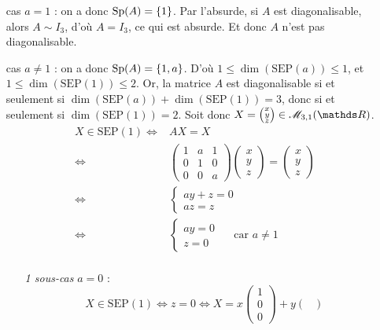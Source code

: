 \begin{enumerate}
	\item[\sc 1\tsup{er} cas] $a = 1$\/ : on a donc $\operatorname{Sp}(A) = \{1\}$. Par l'absurde, si $A$\/ est diagonalisable, alors $A \sim I_3$, d'où $A = I_3$, ce qui est absurde. Et donc $A$\/ n'est pas diagonalisable.
	\item[\sc 2\tsup{nd} cas] $a \neq 1$\/ : on a donc $\operatorname{Sp}(A) = \{1,a\}$. D'où $1 \le \dim(\mathrm{SEP}(a)) \le 1$, et $1 \le \dim(\mathrm{SEP}(1)) \le 2$. Or, la matrice $A$\/ est diagonalisable si et seulement si $\dim(\mathrm{SEP}(a)) + \dim(\mathrm{SEP}(1)) = 3$, donc si et seulement si $\dim(\mathrm{SEP}(1)) = 2$. Soit donc $X = \left( \substack{x\\y\\z} \right) \in \mathscr{M}_{3,1}(\R)$.
		\begin{align*}
			X \in \mathrm{SEP}(1) \iff& AX = X\\
			\iff& \begin{pmatrix}
				1&a&1\\
				0&1&0\\
				0&0&a
			\end{pmatrix} \begin{pmatrix}
				x\\y\\z
			\end{pmatrix} = \begin{pmatrix}
				x\\y\\z
			\end{pmatrix}\\
			\iff& \begin{cases}
				ay + z = 0\\
				az = z
			\end{cases}\\
			\iff& \begin{cases}
				ay = 0\\
				z = 0
			\end{cases}\quad \text{ car } a \neq 1\\
		\end{align*}
		\begin{enumerate}
			\item[\itshape 1\tsup{er} sous-cas] $a = 0$\/ : \[
					X \in \mathrm{SEP}(1) \iff z = 0 \iff X = x\begin{pmatrix}
						1\\0\\0
					\end{pmatrix} + y \begin{pmatrix}

\end{pmatrix}\]
\end{enumerate}
\end{enumerate}
